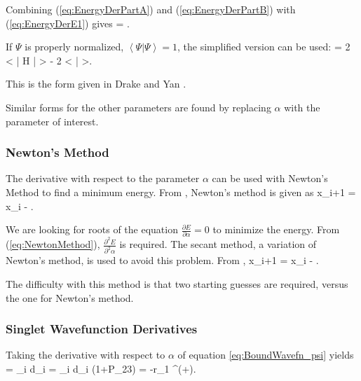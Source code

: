 \documentclass[Dissertation.tex]{subfiles}
\begin{document}
Combining (\ref{eq:EnergyDerPartA}) and (\ref{eq:EnergyDerPartB}) with (\ref{eq:EnergyDerE1}) gives
\beq
{} = .
\label{eq:EnergyDerivative}
\eeq

\noindent If $\Psi$ is properly normalized, $\left< \Psi \Big| \Psi \right> = 1$, the simplified version can be used:
\beq
{} = 2 \left< \Psi \Big| H \Big| \frac{\partial\Psi}{\partial \alpha} \right> - 2 \left< \Psi \Big| \frac{\partial\Psi}{\partial \alpha} \right>.
\label{eq:EnergyDerivativeNorm}
\eeq

\noindent This is the form given in Drake and Yan \cite{Drake1995}.

Similar forms for the other parameters are found by replacing $\alpha$ with the parameter of interest.


\subsubsection{Newton's Method}
The derivative with respect to the parameter $\alpha$ can be used with Newton's Method to find a minimum energy.  From \cite{Sauer2006}, Newton's method is given as
\beq
x_{i+1} = x_i - .
\label{eq:NewtonMethod}
\eeq

We are looking for roots of the equation $\displaystyle\frac{\partial E}{\partial \alpha} = 0$ to minimize the energy.  From (\ref{eq:NewtonMethod}), $\displaystyle\frac{\partial^2 E}{\partial^2 \alpha}$ is required.  The secant method, a variation of Newton's method, is used to avoid this problem.  From \cite{Sauer2006},
\beq
x_{i+1} = x_i - .
\eeq

\noindent The difficulty with this method is that two starting guesses are required, versus the one for Newton's method.


\subsubsection{Singlet Wavefunction Derivatives}
Taking the derivative with respect to $\alpha$ of equation \ref{eq:BoundWavefn_psi} yields
\beq
\frac{\partial \Psi^+}{\partial \alpha} = \sum_i d_i  = \sum_i d_i (1+P_{23})  = -r_1 \Psi^{(+)}.
\label{eq:PsiDerAlpha}
\eeq
\end{document}
